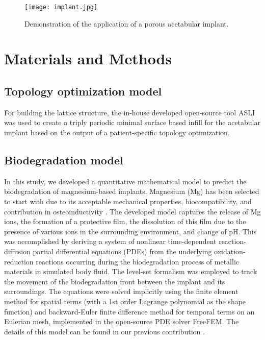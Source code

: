 \begin{figure}[h]
\centering
\medskip
\texttt{[image: implant.jpg]}
\caption[Application of the acetabular implant]{Demonstration of the application of a porous acetabular implant.} \label{fig:cup_implant}
\end{figure}

\section{Materials and Methods}

\subsection{Topology optimization model}

For building the lattice structure, the in-house developed open-source tool ASLI \cite{Perez-Boerema2022} was used to create a triply periodic minimal surface based infill for the acetabular implant based on the output of a patient-specific topology optimization.

\subsection{Biodegradation model}




In this study, we developed a quantitative mathematical model to predict the biodegradation of magnesium-based implants. Magnesium (Mg) has been selected to start with due to its acceptable mechanical properties, biocompatibility, and contribution in osteoinductivity \cite{Agarwal2016}. The developed model captures the release of Mg ions, the formation of a protective film,  the dissolution of this film due to the presence of various ions in the surrounding environment, and change of pH. This was accomplished by deriving a system of nonlinear time-dependent reaction-diffusion partial differential equations (PDEs) from the underlying oxidation-reduction reactions occurring during the biodegradation process of metallic materials in simulated body fluid. The level-set formalism was employed to track the movement of the biodegradation front between the implant and its surroundings. The equations were solved implicitly using the finite element method for spatial terms (with a 1st order Lagrange polynomial as the shape function) and backward-Euler finite difference method for temporal terms on an Eulerian mesh, implemented in the open-source PDE solver FreeFEM\cite{Hecht2012}. The details of this model can be found in our previous contribution \cite{Barzegari2021}. 


